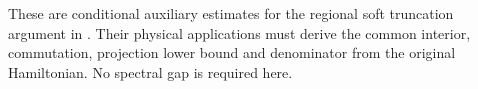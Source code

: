 These are conditional auxiliary estimates for the regional soft
truncation argument in
\cite[lines 1195--1255 and 1373--1392]{Arad2016RigorousRG}.
Their physical applications must derive the common interior,
commutation, projection lower bound and denominator from the original
Hamiltonian. No spectral gap is required here.
